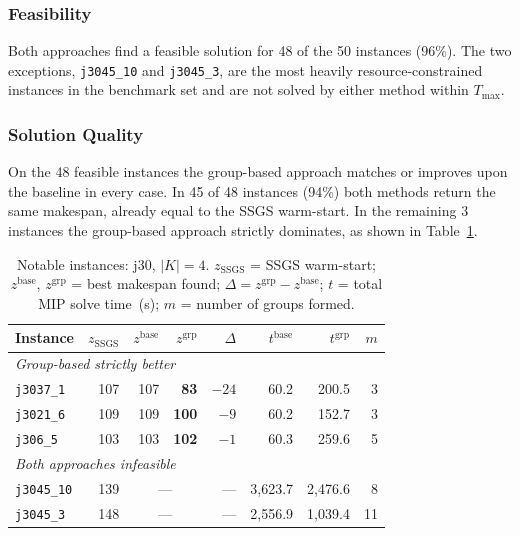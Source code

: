 \subsubsection*{Feasibility}

Both approaches find a feasible solution for 48 of the 50
instances (96\%). The two exceptions, \texttt{j3045\_10}
and \texttt{j3045\_3}, are the most heavily
resource-constrained instances in the benchmark set and are
not solved by either method within $T_{\max}$.

\subsubsection*{Solution Quality}

On the 48 feasible instances the group-based approach matches
or improves upon the baseline in every case. In 45 of 48
instances (94\%) both methods return the same makespan,
already equal to the SSGS warm-start. In the remaining 3
instances the group-based approach strictly dominates, as
shown in Table~\ref{tab:j30_k4_notable}.

\begin{table}[ht]
\centering
\renewcommand{\arraystretch}{1.35}
\caption{Notable instances: j30, $|K|=4$.
         $z_{\mathrm{SSGS}}$ = SSGS warm-start;
         $z^{\mathrm{base}}$, $z^{\mathrm{grp}}$ = best
         makespan found;
         $\Delta = z^{\mathrm{grp}} - z^{\mathrm{base}}$;
         $t$ = total MIP solve time~(s);
         $m$ = number of groups formed.}
\label{tab:j30_k4_notable}
\begin{tabular}{l r r r r r r r}
\hline
\textbf{Instance} &
$z_{\mathrm{SSGS}}$ &
$z^{\mathrm{base}}$ &
$z^{\mathrm{grp}}$ &
$\Delta$ &
$t^{\mathrm{base}}$ &
$t^{\mathrm{grp}}$ &
$m$ \\
\hline
\multicolumn{8}{l}{\textit{Group-based strictly better}} \\
\texttt{j3037\_1}  & 107 & 107 & \textbf{83}  & $-24$ &  60.2 & 200.5 & 3 \\
\texttt{j3021\_6}  & 109 & 109 & \textbf{100} & $-9$  &  60.2 & 152.7 & 3 \\
\texttt{j306\_5}   & 103 & 103 & \textbf{102} & $-1$  &  60.3 & 259.6 & 5 \\
\hline
\multicolumn{8}{l}{\textit{Both approaches infeasible}} \\
\texttt{j3045\_10} & 139 & \multicolumn{2}{c}{---} & --- & 3{,}623.7 & 2{,}476.6 & 8 \\
\texttt{j3045\_3}  & 148 & \multicolumn{2}{c}{---} & --- & 2{,}556.9 & 1{,}039.4 & 11 \\
\hline
\end{tabular}
\end{table}

